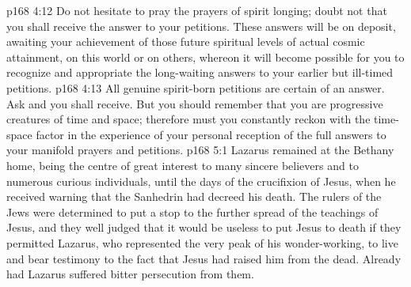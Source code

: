 \vs p168 4:12 \bibnobreakspace Do not hesitate to pray the prayers of spirit longing; doubt not that you shall receive the answer to your petitions. These answers will be on deposit, awaiting your achievement of those future spiritual levels of actual cosmic attainment, on this world or on others, whereon it will become possible for you to recognize and appropriate the long\hyp{}waiting answers to your earlier but ill\hyp{}timed petitions.
\vs p168 4:13 \bibnobreakspace All genuine spirit\hyp{}born petitions are certain of an answer. Ask and you shall receive. But you should remember that you are progressive creatures of time and space; therefore must you constantly reckon with the time\hyp{}space factor in the experience of your personal reception of the full answers to your manifold prayers and petitions.
\vs p168 5:1 Lazarus remained at the Bethany home, being the centre of great interest to many sincere believers and to numerous curious individuals, until the days of the crucifixion of Jesus, when he received warning that the Sanhedrin had decreed his death. The rulers of the Jews were determined to put a stop to the further spread of the teachings of Jesus, and they well judged that it would be useless to put Jesus to death if they permitted Lazarus, who represented the very peak of his wonder\hyp{}working, to live and bear testimony to the fact that Jesus had raised him from the dead. Already had Lazarus suffered bitter persecution from them.
